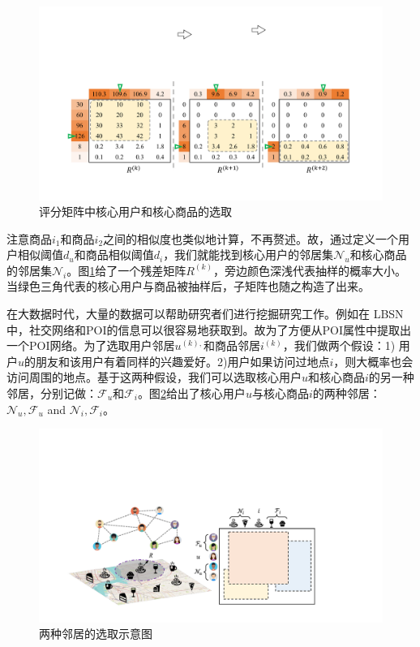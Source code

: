 \begin{figure}[t!]
\includegraphics[width=\textwidth]{pics/MF.pdf}
\caption{评分矩阵中核心用户和核心商品的选取} \label{MF}
\end{figure}
\noindent 注意商品$i_1$和商品$i_2$之间的相似度也类似地计算，不再赘述。故，通过定义一个用户相似阈值$d_u$和商品相似阈值$d_i$，我们就能找到核心用户的邻居集$\mathcal{N}_u$和核心商品的邻居集$\mathcal{N}_i$。图\ref{MF}给了一个残差矩阵$R^{(k)}$，旁边颜色深浅代表抽样的概率大小。当绿色三角代表的核心用户与商品被抽样后，子矩阵也随之构造了出来。

在大数据时代，大量的数据可以帮助研究者们进行挖掘研究工作。例如在 LBSN中，社交网络和POI的信息可以很容易地获取到。故为了方便从POI属性中提取出一个POI网络。为了选取用户邻居$u^{(k),}$和商品邻居$i^{(k)}$，我们做两个假设：1) 用户$u$的朋友和该用户有着同样的兴趣爱好。2)用户如果访问过地点$i$，则大概率也会访问周围的地点。基于这两种假设，我们可以选取核心用户$u$和核心商品$i$的另一种邻居，分别记做：$\mathcal{F}_u$和$\mathcal{F}_i$。图\ref{BLOMA}给出了核心用户$u$与核心商品$i$的两种邻居：$\mathcal{N}_u, \mathcal{F}_u$ and $\mathcal{N}_i, \mathcal{F}_i$。



\begin{figure}[t!]
\includegraphics[width=\textwidth]{pics/BLOMA.pdf}
\caption{两种邻居的选取示意图} 
\label{BLOMA}
\end{figure}

